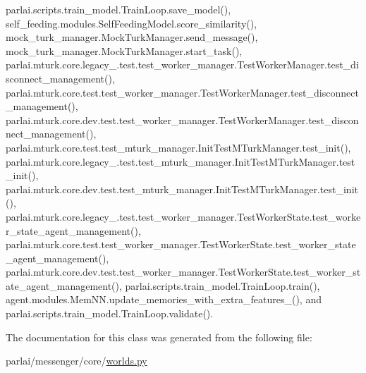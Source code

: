 parlai.\+scripts.\+train\+\_\+model.\+Train\+Loop.\+save\+\_\+model(), self\+\_\+feeding.\+modules.\+Self\+Feeding\+Model.\+score\+\_\+similarity(), mock\+\_\+turk\+\_\+manager.\+Mock\+Turk\+Manager.\+send\+\_\+message(), mock\+\_\+turk\+\_\+manager.\+Mock\+Turk\+Manager.\+start\+\_\+task(), parlai.\+mturk.\+core.\+legacy\+\_.\+test.\+test\+\_\+worker\+\_\+manager.\+Test\+Worker\+Manager.\+test\+\_\+disconnect\+\_\+management(), parlai.\+mturk.\+core.\+test.\+test\+\_\+worker\+\_\+manager.\+Test\+Worker\+Manager.\+test\+\_\+disconnect\+\_\+management(), parlai.\+mturk.\+core.\+dev.\+test.\+test\+\_\+worker\+\_\+manager.\+Test\+Worker\+Manager.\+test\+\_\+disconnect\+\_\+management(), parlai.\+mturk.\+core.\+test.\+test\+\_\+mturk\+\_\+manager.\+Init\+Test\+M\+Turk\+Manager.\+test\+\_\+init(), parlai.\+mturk.\+core.\+legacy\+\_.\+test.\+test\+\_\+mturk\+\_\+manager.\+Init\+Test\+M\+Turk\+Manager.\+test\+\_\+init(), parlai.\+mturk.\+core.\+dev.\+test.\+test\+\_\+mturk\+\_\+manager.\+Init\+Test\+M\+Turk\+Manager.\+test\+\_\+init(), parlai.\+mturk.\+core.\+legacy\+\_.\+test.\+test\+\_\+worker\+\_\+manager.\+Test\+Worker\+State.\+test\+\_\+worker\+\_\+state\+\_\+agent\+\_\+management(), parlai.\+mturk.\+core.\+test.\+test\+\_\+worker\+\_\+manager.\+Test\+Worker\+State.\+test\+\_\+worker\+\_\+state\+\_\+agent\+\_\+management(), parlai.\+mturk.\+core.\+dev.\+test.\+test\+\_\+worker\+\_\+manager.\+Test\+Worker\+State.\+test\+\_\+worker\+\_\+state\+\_\+agent\+\_\+management(), parlai.\+scripts.\+train\+\_\+model.\+Train\+Loop.\+train(), agent.\+modules.\+Mem\+N\+N.\+update\+\_\+memories\+\_\+with\+\_\+extra\+\_\+features\+\_\+(), and parlai.\+scripts.\+train\+\_\+model.\+Train\+Loop.\+validate().



The documentation for this class was generated from the following file\+:\begin{DoxyCompactItemize}
\item 
parlai/messenger/core/\hyperlink{parlai_2messenger_2core_2worlds_8py}{worlds.\+py}\end{DoxyCompactItemize}
